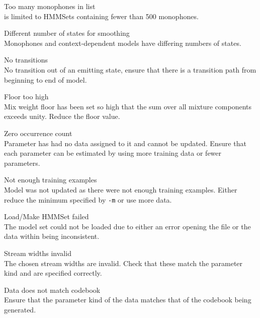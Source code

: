 \begin{itemize}
\begin{itemize}
    Too many monophones in list\\
         is limited to HMMSets containing fewer than
        500 monophones.

    Different number of states for smoothing\\
        Monophones and context-dependent models have differing
        numbers of states.

    No transitions\\
        No transition out of an emitting state, ensure that
        there is a transition path from beginning to end of model.

    Floor too high\\
        Mix weight floor has been set so high that the sum over all 
        mixture components exceeds unity.  Reduce the floor value.

    Zero occurrence count\\
        Parameter has had no data assigned to it and cannot be
        updated.  Ensure that each parameter can be estimated by
        using more training data or fewer parameters.

    Not enough training examples\\
        Model was not updated as there were not enough training examples.
        Either reduce the minimum specified by \texttt{-m} or
        use more data.

    Load/Make HMMSet failed\\
        The model set could not be loaded due to either an error opening the
        file or the data within being inconsistent.

\end{itemize}


\begin{itemize}
    Stream widths invalid\\
        The chosen stream widths are invalid.  Check that these match the 
        parameter kind and are specified correctly.

    Data does not match codebook\\
        Ensure that the parameter kind of the data matches that of the codebook
        being generated.

\end{itemize}



\end{itemize}

